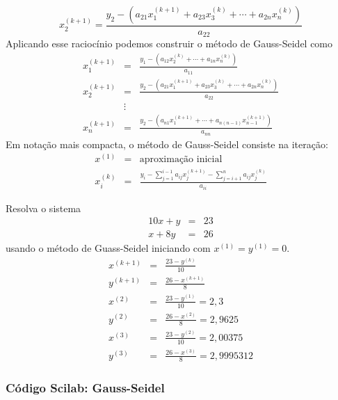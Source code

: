 \begin{equation*}
x_2^{(k+1)} =\frac{y_2 - \left(a_{21}x_1^{(k+1)}+a_{23}x_3^{(k)}+\cdots+a_{2n}x_n^{(k)}\right)}{a_{22}}
\end{equation*}
Aplicando esse raciocínio podemos construir o método de Gauss-Seidel como
\begin{eqnarray*}
x_1^{(k+1)}&=&\frac{y_1 - \left(a_{12}x_2^{(k)}+\cdots+a_{1n}x_n^{(k)}\right)}{a_{11}}\\
x_2^{(k+1)}&=&\frac{y_2 - \left(a_{21}x_1^{(k+1)}+a_{23}x_3^{(k)}+\cdots+a_{2n}x_n^{(k)}\right)}{a_{22}}\\
&\vdots&\\
x_n^{(k+1)}&=&\frac{y_2 - \left(a_{n1}x_1^{(k+1)}+\cdots+a_{n(n-1)}x_{n-1}^{(k+1)}\right)}{a_{nn}}
\end{eqnarray*}
Em notação mais compacta, o método de Gauss-Seidel consiste na iteração:
\begin{eqnarray*}
  x^{(1)} &=& \text{aproximação inicial}\\
  x_i^{(k)} &=& \frac{y_i - \sum_{j=1}^{i-1} a_{ij}x_j^{(k+1)} -\sum_{j=i+1}^{n} a_{ij}x_j^{(k)}}{a_{ii}}
\end{eqnarray*}

\begin{ex}
Resolva o sistema
\begin{eqnarray*}
  10x+y&=&23\\
  x+8y&=&26
\end{eqnarray*}
usando o método de Guass-Seidel iniciando com $x^{(1)}=y^{(1)}=0$.
\begin{eqnarray*}
x^{(k+1)}&=&\frac{23-y^{(k)}}{10}\\
y^{(k+1)}&=&\frac{26-x^{(k+1)}}{8}\\
x^{(2)}&=&\frac{23-y^{(1)}}{10}=2,3\\
y^{(2)}&=&\frac{26-x^{(2)}}{8}=2,9625\\
x^{(3)}&=&\frac{23-y^{(2)}}{10}=2,00375  \\
y^{(3)}&=&\frac{26-x^{(3)}}{8}=2,9995312
\end{eqnarray*}
\end{ex}

\ifisscilab
\subsubsection{Código Scilab: Gauss-Seidel}


\fi
\ifispython
